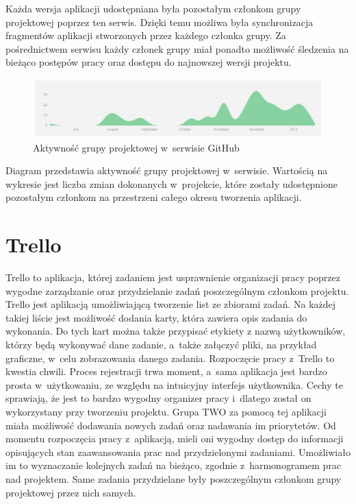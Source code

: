 Każda wersja aplikacji udostępniana była pozostałym członkom grupy projektowej poprzez ten serwis. Dzięki temu możliwa była synchronizacja fragmentów aplikacji stworzonych przez każdego członka grupy. Za pośrednictwem serwisu każdy członek grupy miał ponadto możliwość śledzenia na bieżąco postępów pracy oraz dostępu do najnowszej wersji projektu. 
\begin{figure}[h]
	\centering
	\includegraphics[width=1.00\textwidth]{images/git.png}
	\caption{Aktywność grupy projektowej w~serwisie GitHub}
\end{figure}

Diagram przedstawia aktywność grupy projektowej w~serwisie. Wartością na wykresie jest liczba zmian dokonanych w~projekcie, które zostały udostępnione pozostałym członkom na przestrzeni całego okresu tworzenia aplikacji. 

\section{Trello}
Trello to aplikacja, której zadaniem jest usprawnienie organizacji pracy poprzez wygodne zarządzanie oraz przydzielanie zadań poszczególnym członkom projektu. Trello jest aplikacją umożliwiającą tworzenie list ze zbiorami zadań. Na każdej takiej liście jest możliwość dodania karty, która zawiera opis zadania do wykonania. Do tych kart można także przypisać etykiety z nazwą użytkowników, którzy będą wykonywać dane zadanie, a~także załączyć pliki,  na przykład graficzne, w~celu zobrazowania danego zadania. Rozpoczęcie pracy z~Trello  to kwestia chwili. Proces rejestracji trwa moment, a~sama aplikacja jest bardzo prosta w~użytkowaniu, ze względu na intuicyjny interfejs użytkownika. Cechy te sprawiają, że jest to bardzo wygodny organizer pracy i~dlatego został on wykorzystany przy tworzeniu projektu. Grupa TWO za pomocą tej aplikacji miała możliwość dodawania nowych zadań oraz nadawania im priorytetów. Od momentu rozpoczęcia pracy z~aplikacją, mieli oni wygodny dostęp do informacji opisujących stan zaawansowania prac nad przydzielonymi zadaniami. Umożliwiało im to wyznaczanie  kolejnych zadań na bieżąco, zgodnie z~harmonogramem prac nad projektem. Same zadania przydzielane były poszczególnym członkom grupy projektowej przez nich samych. 

